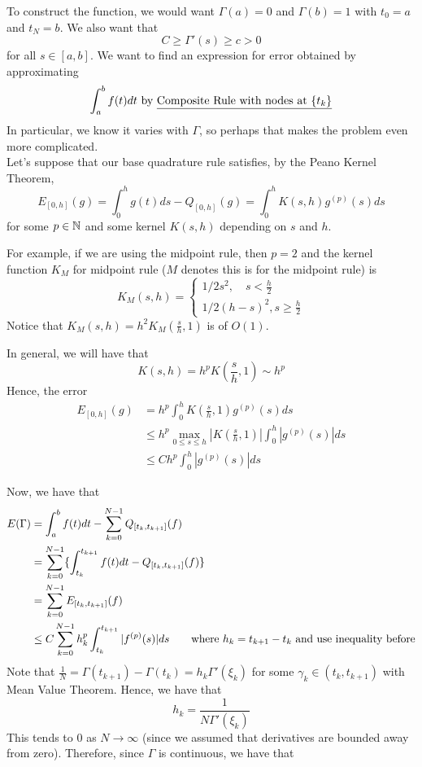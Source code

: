 \documentclass{article}
\begin{document}
To construct the function, we would want $\Gamma(a) = 0$ and $\Gamma(b) = 1$ with $t_0 = a$ and $t_N = b$. We also want that
\[C \geq \Gamma'(s) \geq c > 0\]
for all $s \in [a, b]$. We want to find an expression for error obtained by approximating 
\[\int_a^b f(t) dt \text{ by \underline{Composite Rule with nodes at $\{t_k\}$}}\]
In particular, we know it varies with $\Gamma$, so perhaps that makes the problem even more complicated.\\

Let's suppose that our base quadrature rule satisfies, by the Peano Kernel Theorem,
\[E_{[0, h]}(g) = \int_0^h g(t) ds - Q_{[0, h]}(g)  = \int_0^h K(s, h) g^{(p)}(s) ds\]
for some $p \in \mathbb{N}$ and some kernel $K(s, h)$ depending on $s$ and $h$. 

\begin{example}
For example, if we are using the midpoint rule, then $p = 2$ and the kernel function $K_M$ for midpoint rule ($M$ denotes this is for the midpoint rule) is
\[K_M(s, h) = \begin{cases}
    1/2 s^2,\quad s < \frac{h}{2}\\
    1/2 (h - s)^2, s \geq \frac{h}{2}
\end{cases}\]
Notice that $K_M(s, h) = h^2 K_M(\frac{s}{h}, 1)$ is of $O(1)$.
\end{example}

In general, we will have that
\[K(s, h) = h^p K(\frac{s}{h}, 1) \sim h^p\]
Hence, the error
\begin{align*}
    E_{[0, h]}(g) &= h^p \int_0^h K(\frac{s}{h}, 1) g^{(p)}(s) ds\\
    &\leq h^p \max_{0 \leq s \leq h} |K(\frac{s}{h}, 1)| \int_0^h |g^{(p)}(s)| ds\\
    &\leq C h^p \int_0^h |g^{(p)}(s)| ds \tag*{Note that $C$ is independent of $g$}
\end{align*}

Now, we have that
\begin{align*}\allowdisplaybreaks
    E(\Gamma) &= \int_a^b f(t) dt - \sum_{k=0}^{N-1} Q_{[t_k, t_{k+1}]}(f)\\
    &= \sum_{k=0}^{N-1} \{\int_{t_k}^{t_{k+1}} f(t) dt - Q_{[t_k, t_{k+1}]}(f) \}\\
    &= \sum_{k = 0}^{N-1} E_{[t_k, t_{k+1}]}(f)\\
    &\leq C \sum_{k = 0}^{N-1} h^p_k \int_{t_k}^{t_{k+1}} |f^{(p)}(s)| ds \tag*{where $h_k = t_{k+1} - t_k$ and use inequality before}
\end{align*}
Note that $\frac{1}{N} = \Gamma(t_{k+1}) - \Gamma(t_k) = h_k \Gamma'(\xi_k)$ for some $\gamma_k \in (t_k, t_{k+1})$ with Mean Value Theorem. Hence, we have that
\[h_k = \frac{1}{N \Gamma'(\xi_k)}\]
This tends to $0$ as $N \to \infty$ (since we assumed that derivatives are bounded away from zero). Therefore, since $\Gamma$ is continuous, we have that
\end{document}
